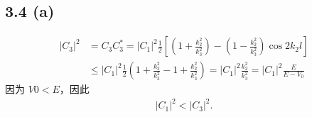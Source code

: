 \subsection{3.4 (a)}
\begin{align}
    |C_3|^2 &= C_3C_3^* = |C_1|^2 \frac12 \left[
        \left(1 + \frac{k_2^2}{k_3^2}\right) - 
        \left(1 - \frac{k_2^2}{k_3^2}\right) \cos 2k_2l
    \right] \\
    &\leqslant |C_1|^2 \frac12 \left(
        1 + \frac{k_2^2}{k_3^2} - 1 + \frac{k_2^2}{k_3^2}
    \right) = |C_1|^2 \frac{k_2^2}{k_3^2} = |C_1|^2 \frac{E}{E - V_0}
\end{align}
因为 $V0 < E$，因此
\begin{align}
    |C_1|^2 < |C_3|^2.
\end{align}

